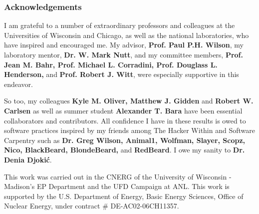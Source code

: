 \begin{frame}
\frametitle{Acknowledgements}
I am grateful to a number of extraordinary professors and colleagues at the 
Universities of Wisconsin and Chicago, as well as the national laboratories, 
who have inspired and encouraged me. My advisor, \textbf{Prof. Paul P.H. 
Wilson}, my laboratory mentor, \textbf{Dr. W. Mark Nutt}, and my committee 
members, \textbf{Prof. Jean M. Bahr, Prof. Michael L. Corradini, Prof. Douglass 
L. Henderson,} and \textbf{Prof. Robert J. Witt}, were especially supportive in 
this endeavor. 

\vspace{\baselineskip}
So too, my colleagues \textbf{Kyle M. Oliver, Matthew J. Gidden} and 
\textbf{Robert W. Carlsen} as well as summer student \textbf{Alexander T. Bara} have 
been essential collaborators and contributors.  All confidence I have in these 
results is owed to software practices inspired by my friends among The Hacker 
Within and Software Carpentry such as \textbf{Dr. Greg Wilson, Animal1, Wolfman, 
Slayer, Scopz, Nico,  BlackBeard, BlondeBeard,} and \textbf{RedBeard}. I owe my 
sanity to \textbf{Dr. Denia Djoki\'{c}}.

\vspace{\baselineskip}
This work was carried out in the CNERG of the University of Wisconsin -
Madison's EP Department and the UFD Campaign at ANL. This work is supported by
the U.S. Department of Energy, Basic Energy Sciences, Office of Nuclear Energy, 
under contract \# DE-AC02-06CH11357.
\end{frame}
